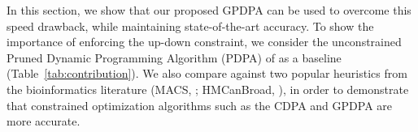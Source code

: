 \documentclass[aoas]{imsart}
\begin{document}
In this section, we show that our proposed GPDPA can be used to
overcome this speed drawback, while maintaining state-of-the-art
accuracy. To show the importance of enforcing the up-down constraint,
we consider the unconstrained Pruned Dynamic Programming Algorithm
(PDPA) of \citet{pruned-dp} as a baseline
(Table~\ref{tab:contribution}). We also compare against two popular
heuristics from the bioinformatics literature (MACS, \citet{MACS};
HMCanBroad, \citet{HMCan}), in order to demonstrate that constrained
optimization algorithms such as the CDPA and GPDPA are more accurate.

\end{document}
